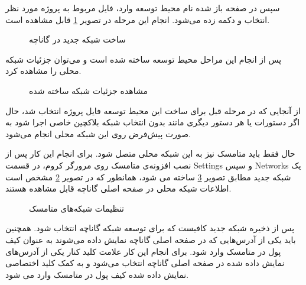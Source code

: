 سپس در صفحه باز شده نام محیط توسعه وارد،  فایل
مربوط به پروژه مورد نظر انتخاب و دکمه
زده می‌شود. انجام این مرحله در تصویر
\ref{fig:ganache-2}
قابل مشاهده است.

\begin{figure}[H]
\centerline{}
\caption{ساخت شبکه جدید در گاناچه}
\label{fig:ganache-2}
\end{figure}

پس از انجام این مراحل محیط توسعه ساخته شده است و می‌توان جزئیات شبکه محلی را مشاهده کرد.

\begin{figure}[H]
\centerline{}
\caption{مشاهده جزئیات شبکه ساخته شده}
\label{fig:ganache-3}
\end{figure}

از آنجایی که در مرحله قبل برای ساخت این محیط توسعه فایل
پروژه انتخاب شد، حال اگر دستورات
یا هر دستور دیگری مانند
بدون انتخاب شبکه بلاکچین خاصی اجرا شود به صورت پیش‌فرض روی این شبکه محلی انجام می‌شود.

حال فقط باید متامسک نیز به این شبکه محلی متصل شود.
برای انجام این کار پس از نصب افزونه‌ی متامسک روی مرورگر کروم، در قسمت
\gls{Settings}
و سپس
\glspl{Network}
یک شبکه جدید مطابق تصویر
\ref{fig:metamask-network}
ساخته می شود، همانطور که در تصویر
\ref{fig:ganache-3}
مشخص است اطلاعات شبکه محلی در صفحه اصلی گاناچه قابل مشاهده هستند.

\begin{figure}[H]
\centerline{}
\caption{تنظیمات شبکه‌های متامسک}
\label{fig:metamask-network}
\end{figure}

پس از ذخیره شبکه جدید کافیست که برای توسعه شبکه گاناچه انتخاب شود.
همچنین باید یکی از آدرس‌هایی که در صفحه اصلی گاناچه نمایش داده می‌شوند به عنوان کیف پول در متامسک وارد شود.
برای انجام این کار علامت کلید کنار یکی از آدرس‌های نمایش داده شده در صفحه اصلی گاناچه انتخاب می‌شود
و به کمک کلید اختصاصی نمایش داده شده کیف پول در متامسک وارد می شود.
